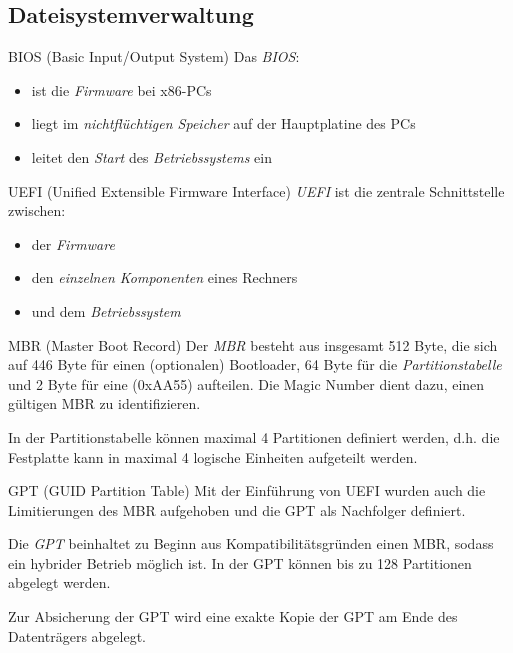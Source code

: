 \documentclass[german]{spicker}
\begin{document}
\newpage
\subsection{Dateisystemverwaltung}

\begin{defi}{BIOS (Basic Input/Output System)}
    Das \emph{BIOS}:
    \begin{itemize}
        \item ist die \emph{Firmware} bei x86-PCs
        \item liegt im \emph{nichtflüchtigen Speicher} auf der Hauptplatine des PCs
        \item leitet den \emph{Start} des \emph{Betriebssystems} ein
    \end{itemize}
\end{defi}

\begin{defi}{UEFI (Unified Extensible Firmware Interface)}
    \emph{UEFI} ist die zentrale Schnittstelle zwischen:
    \begin{itemize}
        \item der \emph{Firmware}
        \item den \emph{einzelnen Komponenten} eines Rechners
        \item und dem \emph{Betriebssystem}
    \end{itemize}
\end{defi}

\begin{bonus}{MBR (Master Boot Record)}
    Der \emph{MBR} besteht aus insgesamt 512 Byte, die sich auf 446 Byte
    für einen (optionalen) Bootloader, 64 Byte für die \emph{Partitionstabelle} und 2 Byte
    für eine \emph{} (0xAA55) aufteilen. Die Magic Number dient dazu, einen
    gültigen MBR zu identifizieren.

    In der Partitionstabelle können maximal 4 Partitionen
    definiert werden, d.h. die Festplatte kann in maximal 4 logische Einheiten aufgeteilt
    werden.
\end{bonus}

\begin{bonus}{GPT (GUID Partition Table)}
    Mit der Einführung von UEFI wurden auch die Limitierungen des
    MBR aufgehoben und die GPT als Nachfolger definiert.

    Die \emph{GPT} beinhaltet zu Beginn
    aus Kompatibilitätsgründen einen MBR, sodass ein hybrider Betrieb möglich
    ist. In der GPT können bis zu 128 Partitionen abgelegt werden.

    Zur Absicherung der
    GPT wird eine exakte Kopie der GPT am Ende des Datenträgers abgelegt.
\end{bonus}
\end{document}
